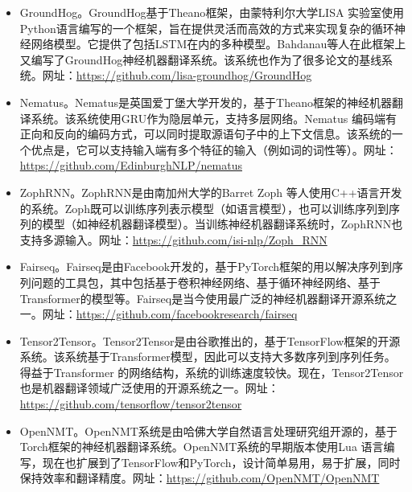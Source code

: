\begin{itemize}
\vspace{0.5em}
\item GroundHog。GroundHog\cite{bahdanau2014neural}基于Theano\cite{al2016theano}框架，由蒙特利尔大学LISA 实验室使用Python语言编写的一个框架，旨在提供灵活而高效的方式来实现复杂的循环神经网络模型。它提供了包括LSTM在内的多种模型。Bahdanau等人在此框架上又编写了GroundHog神经机器翻译系统。该系统也作为了很多论文的基线系统。网址：\url{https://github.com/lisa-groundhog/GroundHog}
\vspace{0.5em}
\item Nematus。Nematus\cite{DBLP:journals/corr/SennrichFCBHHJL17}是英国爱丁堡大学开发的，基于Theano框架的神经机器翻译系统。该系统使用GRU作为隐层单元，支持多层网络。Nematus 编码端有正向和反向的编码方式，可以同时提取源语句子中的上下文信息。该系统的一个优点是，它可以支持输入端有多个特征的输入（例如词的词性等）。网址：\url{https://github.com/EdinburghNLP/nematus}
\vspace{0.5em}
\item ZophRNN。ZophRNN\cite{zoph2016simple}是由南加州大学的Barret Zoph 等人使用C++语言开发的系统。Zoph既可以训练序列表示模型（如语言模型），也可以训练序列到序列的模型（如神经机器翻译模型）。当训练神经机器翻译系统时，ZophRNN也支持多源输入。网址：\url{https://github.com/isi-nlp/Zoph\_RNN}
\vspace{0.5em}
\item Fairseq。Fairseq\cite{Ottfairseq}是由Facebook开发的，基于PyTorch框架的用以解决序列到序列问题的工具包，其中包括基于卷积神经网络、基于循环神经网络、基于Transformer的模型等。Fairseq是当今使用最广泛的神经机器翻译开源系统之一。网址：\url{https://github.com/facebookresearch/fairseq}
\vspace{0.5em}
\item Tensor2Tensor。Tensor2Tensor\cite{VaswaniTensor2Tensor}是由谷歌推出的，基于TensorFlow框架的开源系统。该系统基于Transformer模型，因此可以支持大多数序列到序列任务。得益于Transformer 的网络结构，系统的训练速度较快。现在，Tensor2Tensor也是机器翻译领域广泛使用的开源系统之一。网址：\url{https://github.com/tensorflow/tensor2tensor}
\vspace{0.5em}
\item OpenNMT。OpenNMT\cite{KleinOpenNMT}系统是由哈佛大学自然语言处理研究组开源的，基于Torch框架的神经机器翻译系统。OpenNMT系统的早期版本使用Lua 语言编写，现在也扩展到了TensorFlow和PyTorch，设计简单易用，易于扩展，同时保持效率和翻译精度。网址：\url{https://github.com/OpenNMT/OpenNMT}
\vspace{0.5em}

\end{itemize}
